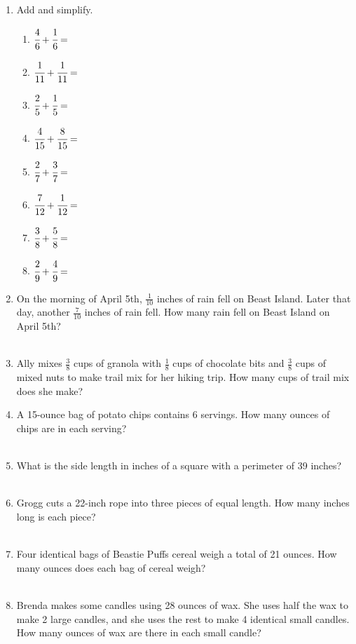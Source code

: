 \documentclass[12pt,letterpaper]{article}
\begin{document}
\begin{large}
\begin{enumerate}
    \item Add and simplify.
    \begin{multicols}{2}
        \begin{enumerate}
            \item $\cfrac{4}{6}+\cfrac{1}{6}=$
            \item $\cfrac{1}{11}+\cfrac{1}{11}=$
            \item $\cfrac{2}{5}+\cfrac{1}{5}=$
            \item $\cfrac{4}{15}+\cfrac{8}{15}=$
            \item $\cfrac{2}{7}+\cfrac{3}{7}=$
            \item $\cfrac{7}{12}+\cfrac{1}{12}=$
            \item $\cfrac{3}{8}+\cfrac{5}{8}=$
            \item $\cfrac{2}{9}+\cfrac{4}{9}=$
        \end{enumerate}
    \end{multicols}

    \pagebreak
    \item On the morning of April 5th, $\frac{1}{10}$
     inches of rain fell on Beast Island. Later that day,
     another $\frac{7}{10}$ inches of rain fell.
      How many rain fell on Beast Island on April 5th?
      \\
    \\

      \item Ally mixes $\frac{3}{8}$ cups of granola with 
      $\frac{1}{8}$ cups of chocolate bits and $\frac{3}{8}$
       cups of mixed nuts to make trail mix for her hiking 
       trip. How many cups of trail mix does she make?
\\
\item A 15-ounce bag of potato chips contains 6 servings. How many ounces of chips are in each serving?\\\\
\item What is the side length in inches of a square with a perimeter of 39 inches?\\\\
\item Grogg cuts a 22-inch rope into three pieces of equal length. How many inches long is each piece?\\\\
\item Four identical bags of Beastie Puffs cereal weigh a total of 21 ounces. How many ounces does each bag of cereal weigh?\\\\
\item Brenda makes some candles using 28 ounces of wax. She uses half the wax to make 2 large candles, and she uses the rest to make 4 identical small candles. How many ounces of wax are there in each small candle?


\end{enumerate}
\end{large}
\end{document}
